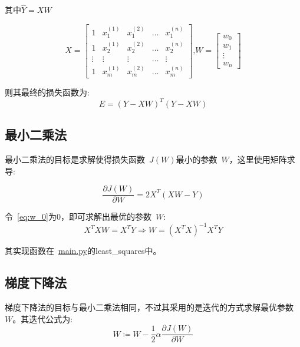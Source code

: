\documentclass[UTF8]{article} %
\begin{document}
    其中$\hat{Y} = X W$

    \begin{equation}
        X = \begin{bmatrix}
                1      & x_1^{(1)} & x_1^{(2)} & \dots & x_1^{(n)} \\
                1      & x_2^{(1)} & x_2^{(2)} & \dots & x_2^{(n)} \\
                \vdots & \vdots    & \vdots    & \dots & \vdots    \\
                1      & x_m^{(1)} & x_m^{(2)} & \dots & x_m^{(n)}
        \end{bmatrix} \text{,}
        W = \begin{bmatrix}
                w_0    \\
                w_1    \\
                \vdots \\
                w_n
        \end{bmatrix}
        \label{eq:X_W}
    \end{equation}

    则其最终的损失函数为:
    \begin{equation}
        E = (Y - XW)^T(Y - XW)
        \label{eq:E_XW}
    \end{equation}

    \subsection{最小二乘法}
    最小二乘法的目标是求解使得损失函数~$J(W)$最小的参数~$W$，这里使用矩阵求导:

    \begin{equation}
        \frac{\partial J(W)}{\partial W} = 2 X^T (X W - Y) \label{eq:w_0}
    \end{equation}

    令~\eqref{eq:w_0}为0，即可求解出最优的参数~$W$:
    \begin{equation}
        X^T X W = X^T Y \Rightarrow W = (X^T X)^{-1} X^T Y \label{eq:w_1}
    \end{equation}

    其实现函数在~\href{run:main.py}{main.py}的least\_squares中。

    \subsection{梯度下降法}
    梯度下降法的目标与最小二乘法相同，不过其采用的是迭代的方式求解最优参数~$W$。其迭代公式为:
    \begin{equation}
        W \coloneqq W - \frac{1}{2} \alpha \frac{\partial J(W)}{\partial W} \label{eq:w_2}
    \end{equation}
\end{document}
